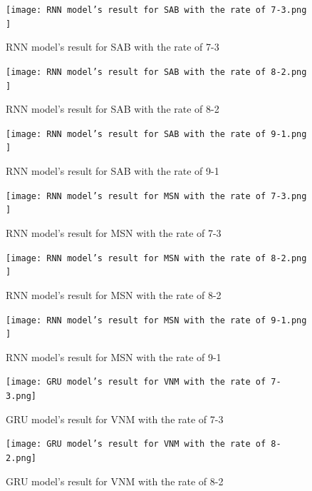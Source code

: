 \documentclass{ieeeojies}
\begin{document}
    \begin{figure}[H]
    \begin{minipage}{0.23\textwidth}
    \centering
    \texttt{[image: RNN model’s result for SAB with the rate of 7-3.png ]}
    \caption{RNN model’s result for SAB with the rate of 7-3}
    \end{minipage}
    \hfill
    \begin{minipage}{0.23\textwidth}
    \centering
    \texttt{[image: RNN model’s result for SAB with the rate of 8-2.png ]}
    \caption{RNN model’s result for SAB with the rate of 8-2}
    \end{minipage}
    \end{figure}
    
    \begin{figure}[H]
    \begin{minipage}{0.23\textwidth}
    \centering
    \texttt{[image: RNN model’s result for SAB with the rate of 9-1.png ]}
    \caption{RNN model’s result for SAB with the rate of 9-1}
    \end{minipage}
     \hfill
     \begin{minipage}{0.23\textwidth}
    \centering
    \texttt{[image: RNN model’s result for MSN with the rate of 7-3.png  ]}
    \caption{RNN model’s result for MSN  with the rate of 7-3}
    \end{minipage}
     \end{figure}
     
    \begin{figure}[H]
    \begin{minipage}{0.23\textwidth}
    \centering
    \texttt{[image: RNN model’s result for MSN with the rate of 8-2.png ]}
    \caption{RNN model’s result for MSN with the rate of 8-2}
    \end{minipage}
     \hfill
     \begin{minipage}{0.23\textwidth}
    \centering
    \texttt{[image: RNN model’s result for MSN with the rate of 9-1.png  ]}
    \caption{RNN model’s result for MSN  with the rate of 9-1}
    \end{minipage}
\end{figure}

   \begin{figure}[H]
    \begin{minipage}{0.23\textwidth}
    \centering
    \texttt{[image: GRU model’s result for VNM with the rate of 7-3.png]}
    \caption{GRU model’s result for VNM with the rate of 7-3}
    \end{minipage}
    \hfill
    \begin{minipage}{0.23\textwidth}
    \centering
    \texttt{[image: GRU model’s result for VNM with the rate of 8-2.png]}
    \caption{GRU model’s result for VNM with the rate of 8-2}
    \end{minipage}
    \end{figure}
    
\end{document}
